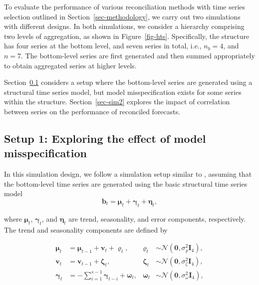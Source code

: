 \documentclass[11pt,a4paper,]{article}
\begin{document}
To evaluate the performance of various reconciliation methods with time
series selection outlined in Section~\ref{sec-methodology}, we carry out
two simulations with different designs. In both simulations, we consider
a hierarchy comprising two levels of aggregation, as shown in
Figure~\ref{fig-hts}. Specifically, the structure has four series at the
bottom level, and seven series in total, i.e., \(n_b = 4\), and
\(n = 7\). The bottom-level series are first generated and then summed
appropriately to obtain aggregated series at higher levels.

Section~\ref{sec-sim1} considers a setup where the bottom-level series
are generated using a structural time series model, but model
misspecification exists for some series within the structure.
Section~\ref{sec-sim2} explores the impact of correlation between series
on the performance of reconciled forecasts.

\hypertarget{sec-sim1}{%
\subsection{Setup 1: Exploring the effect of model
misspecification}\label{sec-sim1}}

In this simulation design, we follow a simulation setup similar to
\textcite{Wickramasuriya2019-fc}, assuming that the bottom-level time
series are generated using the basic structural time series model \[
\boldsymbol{b}_t=\boldsymbol{\mu}_t+\boldsymbol{\gamma}_t+\boldsymbol{\eta}_t,
\]

where \(\boldsymbol{\mu}_t\), \(\boldsymbol{\gamma}_t\), and
\(\boldsymbol{\eta}_t\) are trend, seasonality, and error components,
respectively. The trend and seasonality components are defined by

\[
\begin{aligned}
\boldsymbol{\mu}_t & =\boldsymbol{\mu}_{t-1}+\boldsymbol{v}_t+\boldsymbol{\varrho}_t, & \boldsymbol{\varrho}_t & \sim \mathcal{N}\left(\boldsymbol{0}, \sigma_{\varrho}^2 \boldsymbol{I}_4\right), \\
\boldsymbol{v}_t & =\boldsymbol{v}_{t-1}+\boldsymbol{\zeta}_t, & \boldsymbol{\zeta}_t & \sim \mathcal{N}\left(\boldsymbol{0}, \sigma_\zeta^2 \boldsymbol{I}_4\right), \\
\boldsymbol{\gamma}_t & =-\sum_{i=1}^{s-1} \boldsymbol{\gamma}_{t-i}+\boldsymbol{\omega}_t, & \boldsymbol{\omega}_t & \sim \mathcal{N}\left(\boldsymbol{0}, \sigma_\omega^2 \boldsymbol{I}_4\right),
\end{aligned}
\]
\end{document}
